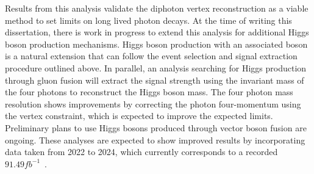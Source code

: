 Results from this analysis validate the diphoton vertex reconstruction as a viable method to set limits on long lived photon decays. At the time of writing this dissertation, there is work in progress to extend this analysis for additional Higgs boson production mechanisms. Higgs boson production with an associated \PW boson is a natural extension that can follow the event selection and signal extraction procedure outlined above. In parallel, an analysis searching for Higgs production through gluon fusion will extract the signal strength using the invariant mass of the four photons to reconstruct the Higgs boson mass. The four photon mass resolution shows improvements by correcting the photon four-momentum using the vertex constraint, which is expected to improve the expected limits. Preliminary plans to use Higgs bosons produced through vector boson fusion are ongoing. These analyses are expected to show improved results by incorporating data taken from 2022 to 2024, which currently corresponds to a recorded $91.49\unit{fb^{-1}}$~\cite{CMSlumi}.